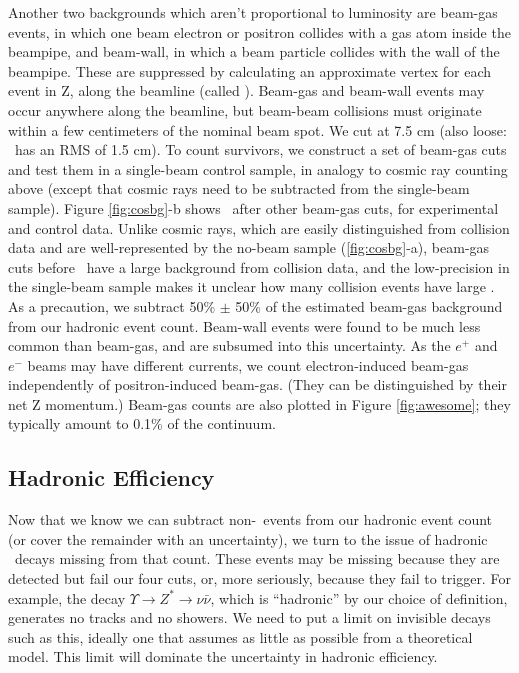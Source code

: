 \documentclass[aps,prd,preprint,superscriptaddress,tightenlines,nofootinbib,floatfix]{revtex4}
\begin{document}
Another two backgrounds which aren't proportional to luminosity are
beam-gas events, in which one beam electron or positron collides with
a gas atom inside the beampipe, and beam-wall, in which a beam
particle collides with the wall of the beampipe.  These are suppressed
by calculating an approximate vertex for each event in Z, along the
beamline (called \dz).  Beam-gas and beam-wall events may occur
anywhere along the beamline, but beam-beam collisions must originate
within a few centimeters of the nominal beam spot.  We cut at 7.5 cm
(also loose: \dz\ has an RMS of 1.5 cm).  To count survivors, we
construct a set of beam-gas cuts and test them in a single-beam
control sample, in analogy to cosmic ray counting above (except that
cosmic rays need to be subtracted from the single-beam sample).
Figure \ref{fig:cosbg}-b shows \dz\ after other beam-gas cuts, for
experimental and control data.  Unlike cosmic rays, which are easily
distinguished from collision data and are well-represented by the
no-beam sample (\ref{fig:cosbg}-a), beam-gas cuts before \dz\ have a
large background from collision data, and the low-precision in the
single-beam sample makes it unclear how many collision events have
large \dz.  As a precaution, we subtract 50\% $\pm$ 50\% of the
estimated beam-gas background from our hadronic event count.
Beam-wall events were found to be much less common than beam-gas, and
are subsumed into this uncertainty.  As the $e^+$ and $e^-$ beams may
have different currents, we count electron-induced beam-gas
independently of positron-induced beam-gas.  (They can be
distinguished by their net Z momentum.)  Beam-gas counts are also
plotted in Figure \ref{fig:awesome}; they typically amount to 0.1\% of
the continuum.

%
\subsection{Hadronic Efficiency}
%

Now that we know we can subtract non-\ups\ events from our hadronic
event count (or cover the remainder with an uncertainty), we turn to
the issue of hadronic \ups\ decays missing from that count.  These
events may be missing because they are detected but fail our four
cuts, or, more seriously, because they fail to trigger.  For example,
the decay $\Upsilon \to Z^* \to \nu\bar{\nu}$, which is ``hadronic''
by our choice of definition, generates no tracks and no showers.  We
need to put a limit on invisible decays such as this, ideally one that
assumes as little as possible from a theoretical model.  This limit
will dominate the uncertainty in hadronic efficiency.
\end{document}
